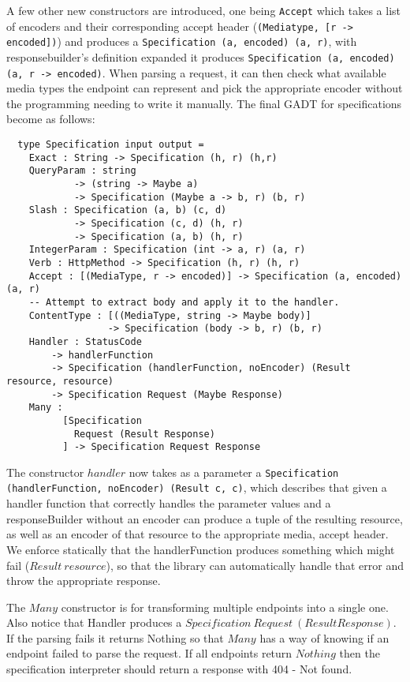 A few other new constructors are introduced, one being \texttt{Accept} which
takes a list of encoders and their corresponding accept header
(\texttt{(Mediatype, [r -> encoded])}) and produces a \texttt{Specification (a,
    encoded) (a, r)}, with responsebuilder's definition expanded it produces
    \texttt{Specification (a, encoded) (a, r -> encoded)}. When parsing a
    request, it can then check what available media types the endpoint can
    represent and pick the appropriate encoder without the programming needing
    to write it manually. The final GADT for specifications become as follows:

\begin{lstlisting}
  type Specification input output =
    Exact : String -> Specification (h, r) (h,r)
    QueryParam : string 
            -> (string -> Maybe a) 
            -> Specification (Maybe a -> b, r) (b, r)
    Slash : Specification (a, b) (c, d) 
            -> Specification (c, d) (h, r) 
            -> Specification (a, b) (h, r) 
    IntegerParam : Specification (int -> a, r) (a, r)
    Verb : HttpMethod -> Specification (h, r) (h, r)
    Accept : [(MediaType, r -> encoded)] -> Specification (a, encoded) (a, r)
    -- Attempt to extract body and apply it to the handler.
    ContentType : [((MediaType, string -> Maybe body)]
                  -> Specification (body -> b, r) (b, r)
    Handler : StatusCode 
        -> handlerFunction 
        -> Specification (handlerFunction, noEncoder) (Result resource, resource)
        -> Specification Request (Maybe Response)
    Many :
          [Specification 
            Request (Result Response)
          ] -> Specification Request Response
\end{lstlisting}

The constructor $handler$ now takes as a parameter a \texttt{Specification
(handlerFunction, noEncoder) (Result c, c)}, which describes that given a
handler function that correctly handles the parameter values and a
responseBuilder without an encoder can produce a tuple of the resulting
resource, as well as an encoder of that resource to the appropriate media,
accept header. We enforce statically that the handlerFunction produces something
which might fail ($Result\ resource$), so that the library can automatically
handle that error and throw the appropriate response. 

The $Many$ constructor is for transforming multiple endpoints into a single one.
Also notice that Handler produces a $Specification\ Request\ (Result Response)$.
If the parsing fails it returns Nothing so that $Many$ has a way of knowing if
an endpoint failed to parse the request. If all endpoints return $Nothing$ then
the specification interpreter should return a response with  404 - Not found.


